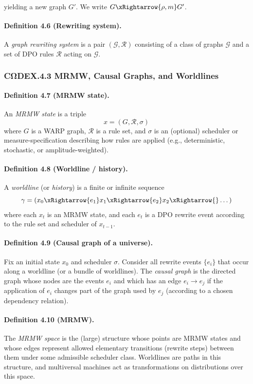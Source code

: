 yielding a new graph $G'$. We write $G \xRightarrow{\rho,m} G'$.

\paragraph{Definition 4.6 (Rewriting system).}
A \emph{graph rewriting system} is a pair $(\mathcal{G},\mathcal{R})$
consisting of a class of graphs $\mathcal{G}$ and a set of DPO rules
$\mathcal{R}$ acting on $\mathcal{G}$.

\subsubsection*{CΩDEX.4.3 \quad MRMW, Causal Graphs, and Worldlines}

\paragraph{Definition 4.7 (MRMW state).}
An \emph{MRMW state} is a triple
\[
  x = (G,\mathcal{R},\sigma)
\]
where $G$ is a WARP graph, $\mathcal{R}$ is a rule set, and $\sigma$ is an
(optional) scheduler or measure-specification describing how rules are
applied (e.g., deterministic, stochastic, or amplitude-weighted).

\paragraph{Definition 4.8 (Worldline / history).}
A \emph{worldline} (or \emph{history}) is a finite or infinite sequence
\[
  \gamma = (x_0 \xRightarrow{e_1} x_1 \xRightarrow{e_2} x_2 \xRightarrow{}\dots)
\]
where each $x_t$ is an MRMW state, and each $e_t$ is a DPO rewrite event
according to the rule set and scheduler of $x_{t-1}$.

\paragraph{Definition 4.9 (Causal graph of a universe).}
Fix an initial state $x_0$ and scheduler $\sigma$. Consider all rewrite
events $\{e_i\}$ that occur along a worldline (or a bundle of worldlines).
The \emph{causal graph} is the directed graph whose nodes are the events
$e_i$ and which has an edge $e_i \to e_j$ if the application of $e_i$
changes part of the graph used by $e_j$ (according to a chosen dependency
relation).

\paragraph{Definition 4.10 (MRMW).}
The \emph{MRMW space} is the (large) structure whose points are MRMW
states and whose edges represent allowed elementary transitions
(rewrite steps) between them under some admissible scheduler class.
Worldlines are paths in this structure, and multiversal machines act as
transformations on distributions over this space.

